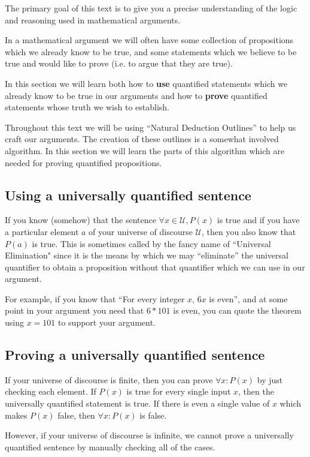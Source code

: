 The primary goal of this text is to give you a precise understanding of the logic and reasoning used in mathematical arguments.  

In a mathematical argument we will often have some collection of propositions which we already know to be true, and some statements which we believe to be true and would like to prove (i.e. to argue that they are true).

In this section we will learn both how to \textbf{use} quantified statements which we already know to be true in our arguments and how to \textbf{prove} quantified statements whose truth we wish to establish.

Throughout this text we will be using ``Natural Deduction Outlines'' to help us craft our arguments.  The creation of these outlines is a somewhat involved algorithm.  In this section we will learn the parts of this algorithm which are needed for proving quantified propositions. 

\subsection{Using a universally quantified sentence}

If you know (somehow) that the sentence $\forall x \in \mathcal{U}, P(x)$ is true and if you have a particular element $a$ of your universe of discourse $\mathcal{U}$, then you also know that $P(a)$ is true.  This is sometimes called by the fancy name of ``Universal Elimination" since it is the means by which we may ``eliminate'' the universal quantifier to obtain a proposition without that quantifier which we can use in our argument.

For example, if you know that ``For every integer $x$, $6x$ is even'', and at some point in your argument you need that $6*101$ is even, you can  quote the theorem using $x = 101$ to support your argument.

\subsection{Proving a universally quantified sentence}

If your universe of discourse is finite, then you can prove $\forall x: P(x)$ by just checking each element.  If $P(x)$ is true for every single input $x$, then the universally quantified statement is true.  If there is even a single value of $x$ which makes $P(x)$ false, then $\forall x: P(x)$ is false.

However, if your universe of discourse is infinite, we cannot prove a universally quantified sentence by manually checking all of the cases.  

